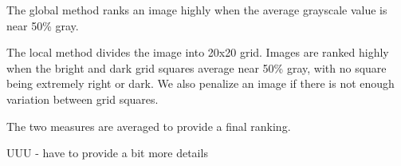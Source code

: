 \documentclass{article}
\begin{document}
The global method ranks an image highly when the average grayscale value is near 50\% gray.

The local method divides the image into 20x20 grid. Images are ranked highly when the bright and dark grid squares average near 50\% gray, with no square being extremely right or dark. We also penalize an image if there is not enough variation between grid squares.

The two measures are averaged to provide a final ranking.

UUU - have to provide a bit more details
   





\end{document}
